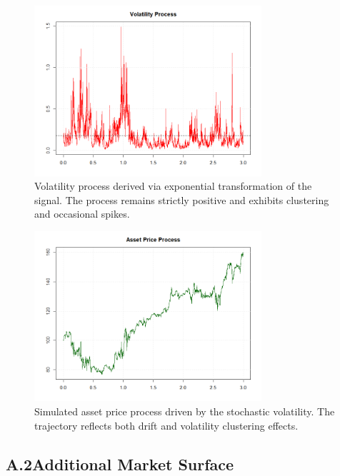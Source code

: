 \begin{figure}[H]
    \centering
    \includegraphics[width=0.75\textwidth]{figures/A.1 Process Dynamics/volatility_process.png}
    \caption{Volatility process derived via exponential transformation of the signal. The process remains strictly positive and exhibits clustering and occasional spikes.}
    \label{fig:VolatilityProcess}
\end{figure}

\begin{figure}[H]
    \centering
    \includegraphics[width=0.75\textwidth]{figures/A.1 Process Dynamics/asset_price.png}
    \caption{Simulated asset price process driven by the stochastic volatility. The trajectory reflects both drift and volatility clustering effects.}
    \label{fig:AssetPrice}
\end{figure}



\newpage
\subsection*{A.2\quad Additional Market Surface}

